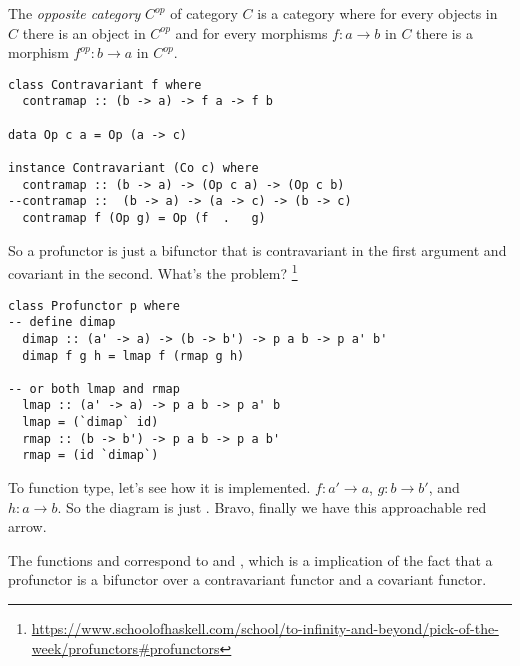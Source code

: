 \hfill
\begin{remark}
  The \emph{opposite category} $C^{op}$ of category $C$ is a category where for
  every objects in $C$ there is an object in $C^{op}$ and for every morphisms $f
  : a\to b$ in $C$ there is a morphism $f^{op} : b \to a$ in $C^{op}$.
\end{remark}

\begin{lstlisting}
class Contravariant f where
  contramap :: (b -> a) -> f a -> f b

data Op c a = Op (a -> c)

instance Contravariant (Co c) where
  contramap :: (b -> a) -> (Op c a) -> (Op c b)
--contramap ::  (b -> a) -> (a -> c) -> (b -> c)
  contramap f (Op g) = Op (f  .   g)
\end{lstlisting}

So a profunctor is just a bifunctor that is contravariant in the first argument
and covariant in the second. What's the problem?
\footnote{\url{https://www.schoolofhaskell.com/school/to-infinity-and-beyond/pick-of-the-week/profunctors\#profunctors}}

\begin{lstlisting}
class Profunctor p where
-- define dimap
  dimap :: (a' -> a) -> (b -> b') -> p a b -> p a' b'
  dimap f g h = lmap f (rmap g h)

-- or both lmap and rmap
  lmap :: (a' -> a) -> p a b -> p a' b
  lmap = (`dimap` id)
  rmap :: (b -> b') -> p a b -> p a b'
  rmap = (id `dimap`)
\end{lstlisting}

To function type, let's see how it is implemented. $f : a' \to a$, $g : b \to
b'$, and $h : a \to b$. So the diagram is just . Bravo, finally we have this
approachable red arrow.

The functions  and  correspond to  and
, which is a implication of the fact that a profunctor is a bifunctor
over a contravariant functor and a covariant functor.
